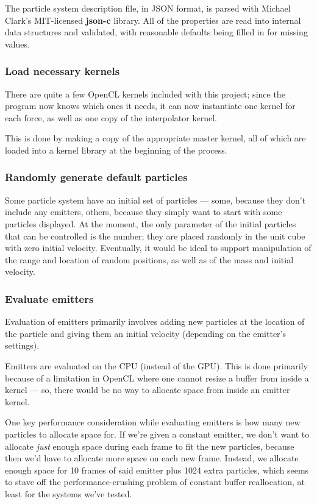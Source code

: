 \documentclass{acmsiggraph}
\begin{document}
The particle system description file, in JSON format, is parsed with Michael Clark's MIT-licensed {\bf json-c} library. All of the properties are read into internal data structures and validated, with reasonable defaults being filled in for missing values.

\subsubsection{Load necessary kernels}

There are quite a few OpenCL kernels included with this project; since the program now knows which ones it needs, it can now instantiate one kernel for each force, as well as one copy of the interpolator kernel.

This is done by making a copy of the appropriate master kernel, all of which are loaded into a kernel library at the beginning of the process.

\subsubsection{Randomly generate default particles}

Some particle system have an initial set of particles --- some, because they don't include any emitters, others, because they simply want to start with some particles displayed. At the moment, the only parameter of the initial particles that can be controlled is the number; they are placed randomly in the unit cube with zero initial velocity. Eventually, it would be ideal to support manipulation of the range and location of random positions, as well as of the mass and initial velocity.

\subsubsection{Evaluate emitters}

Evaluation of emitters primarily involves adding new particles at the location of the particle and giving them an initial velocity (depending on the emitter's settings).

Emitters are evaluated on the CPU (instead of the GPU). This is done primarily because of a limitation in OpenCL where one cannot resize a buffer from inside a kernel --- so, there would be no way to allocate space from inside an emitter kernel.

One key performance consideration while evaluating emitters is how many new particles to allocate space for. If we're given a constant emitter, we don't want to allocate {\it just} enough space during each frame to fit the new particles, because then we'd have to allocate more space on each new frame. Instead, we allocate enough space for 10 frames of said emitter plus 1024 extra particles, which seems to stave off the performance-crushing problem of constant buffer reallocation, at least for the systems we've tested.
\end{document}
